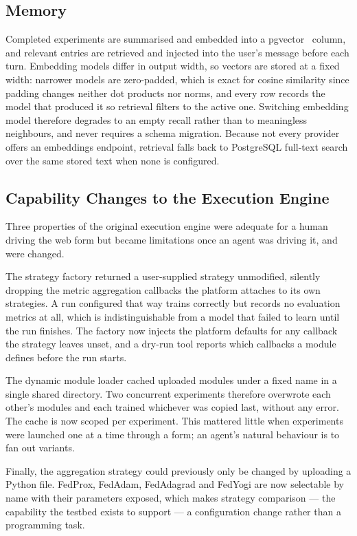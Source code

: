 \documentclass[conference]{IEEEtran}
\begin{document}
\subsection{Memory}

Completed experiments are summarised and embedded into a
pgvector~\cite{pgvector} column, and relevant entries are retrieved and
injected into the user's message before each turn.
Embedding models differ in output width, so vectors are stored at a fixed
width: narrower models are zero-padded, which is exact for cosine
similarity since padding changes neither dot products nor norms, and
every row records the model that produced it so retrieval filters to the
active one.
Switching embedding model therefore degrades to an empty recall rather
than to meaningless neighbours, and never requires a schema migration.
Because not every provider offers an embeddings endpoint, retrieval falls
back to PostgreSQL full-text search over the same stored text when none
is configured.

\subsection{Capability Changes to the Execution Engine}

Three properties of the original execution engine were adequate for a
human driving the web form but became limitations once an agent was
driving it, and were changed.

The strategy factory returned a user-supplied strategy unmodified,
silently dropping the metric aggregation callbacks the platform attaches
to its own strategies.
A run configured that way trains correctly but records no evaluation
metrics at all, which is indistinguishable from a model that failed to
learn until the run finishes.
The factory now injects the platform defaults for any callback the
strategy leaves unset, and a dry-run tool reports which callbacks a
module defines before the run starts.

The dynamic module loader cached uploaded modules under a fixed name in a
single shared directory.
Two concurrent experiments therefore overwrote each other's modules and
each trained whichever was copied last, without any error.
The cache is now scoped per experiment.
This mattered little when experiments were launched one at a time through
a form; an agent's natural behaviour is to fan out variants.

Finally, the aggregation strategy could previously only be changed by
uploading a Python file.
FedProx, FedAdam, FedAdagrad and FedYogi are now selectable by name with
their parameters exposed, which makes strategy comparison --- the
capability the testbed exists to support --- a configuration change
rather than a programming task.
\end{document}
